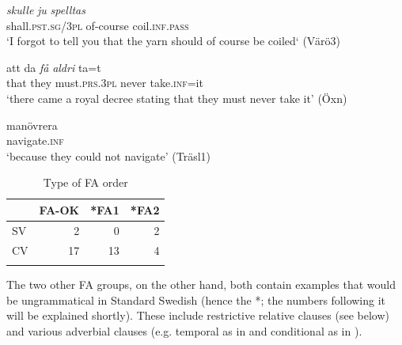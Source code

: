 \documentclass[output=paper,colorlinks,citecolor=brown,draft,draftmode]{langscibook}
\begin{document}
\ea\label{ex:petzell:13}

\gll    \textit{{skulle}} \textit{{ju}}        \textit{spelltas}    \\
    shall.\textsc{pst.sg}/3\textsc{pl}  of-course  coil.\textsc{inf}.\textsc{pass}\\
\glt `I forgot to tell you that the yarn should of course be coiled‘ (Värö3)  \\


\gll    att      da \textit{{få}} \textit{{aldri}} ta=t        \\
    that    they    must.\textsc{prs}.3\textsc{pl}  never    take.\textsc{inf}=it    \\
\glt `there came a royal decree stating that they must never take it’ (Öxn)    \\


\gll    manövrera   \\
    navigate.\textsc{inf}\\
\glt `because they could not navigate’ (Träsl1)
\z
\z

\begin{table}
\caption{\label{tab:petzell:1b}Type of FA order}
\begin{tabular}{lrrr}
\lsptoprule
& FA-OK & *FA1 & *FA2\\\midrule
SV & 2 & 0 & 2\\
CV & 17 & 13 & 4\\
\lspbottomrule
\end{tabular}
\end{table}

The two other FA groups, on the other hand, both contain examples that would be ungrammatical in Standard Swedish (hence the *; the numbers following it will be explained shortly). These include restrictive relative clauses (see  below) and various adverbial clauses (e.g. temporal as in  and conditional as in ).
\end{document}
